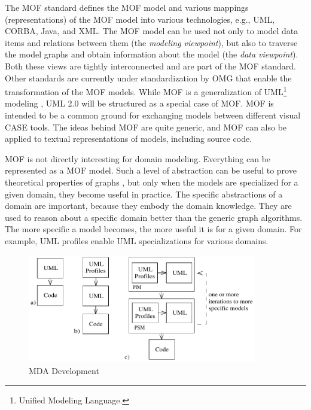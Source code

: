 The MOF standard defines the MOF model and various mappings (representations) of the MOF model into various technologies, e.g., UML, CORBA, Java, and XML. The MOF model can be used not only to model data items and relations between them (the \textit{modeling viewpoint}), but also to traverse the model graphs and obtain information about the model (the \textit{data viewpoint}). Both these views are tightly interconnected and are part of the MOF standard. Other standards are currently under standardization by OMG that enable the transformation of the MOF models. While MOF is a generalization of UML\footnote{Unified Modeling Language.} modeling \cite{www.uml}, UML 2.0 will be structured as a special case of MOF. MOF is intended to be a common ground for exchanging models between different visual CASE tools. The ideas behind MOF are quite generic, and MOF can also be applied to textual representations of models, including source code.


MOF is not directly interesting for domain modeling. Everything can be represented as a MOF model. Such a level of abstraction can be useful to prove theoretical properties of graphs \cite{mens.99}, but only when the models are specialized for a given domain, they become useful in practice. The specific abstractions of a domain are important, because they embody the domain knowledge. They are used to reason about a specific domain better than the generic graph algorithms. The more specific a model becomes, the more useful it is for a given domain. For example, UML profiles \cite{www.uml} enable UML specializations for various domains.

\begin{figure}[ht]
	\begin{center}
		\includegraphics[width=10cm,height=!]{ch02/mda}
	\end{center}
	\caption{MDA Development}
	\label{fig:mda}
\end{figure}

